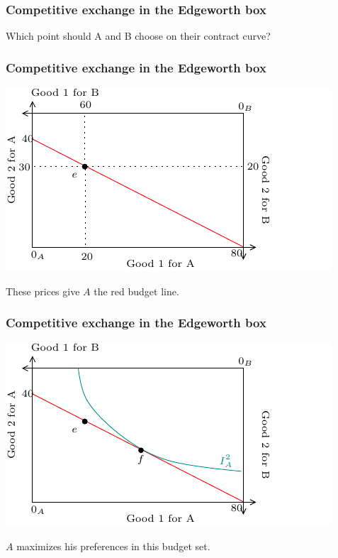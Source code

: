 \documentclass[xcolor=pdftex,dvipsnames]{beamer}
\begin{document}
\begin{frame}
  \frametitle{Competitive exchange in the Edgeworth box}
  Which point should A and B choose on their contract curve?
  \bigskip

  \bigskip



  \bigskip
{}

\end{frame}

\begin{frame}
  \frametitle{Competitive exchange in the Edgeworth box}
  \begin{center}
    \includegraphics{pics/CompetitiveEq1}
  \end{center}
These prices give $A$ the red budget line. 
\end{frame}

\begin{frame}
  \frametitle{Competitive exchange in the Edgeworth box}
  \begin{center}
    \includegraphics{pics/CompetitiveEq2}
  \end{center}
$A$ maximizes his preferences in this budget set.
\end{frame}
\end{document}
